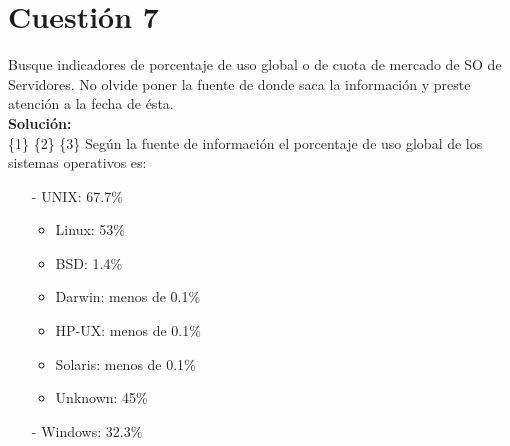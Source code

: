 \documentclass[a4paper, 11pt]{article} %
\begin{document}
\section{Cuestión 7}
Busque indicadores de porcentaje de uso global o de cuota de mercado de SO de Servidores. No olvide poner la fuente de donde saca la información y preste atención a la fecha de ésta.\\
\textbf{Solución:}\\
\{1\} \{2\} \{3\} Según la fuente de información el porcentaje de uso global de los sistemas operativos es:
\begin{itemize}
\item[-] UNIX: 67.7\%
	\begin{itemize}
	\item Linux: 53\%
	\item BSD: 1.4\%
	\item Darwin: menos de 0.1\%
	\item HP-UX: menos de 0.1\%
	\item Solaris: menos de 0.1\%
	\item Unknown: 45\%
	\end{itemize}
\item[-] Windows: 32.3\%
\end{itemize}
\end{document}
